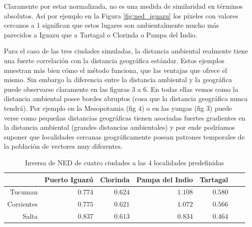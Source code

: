   \par Claramente por estar normalizada, no es una medida de similaridad en
    términos absolutos. Así por ejemplo en la Figura \ref{fig:ned_iguazu} los
    píxeles con valores
    cercanos a 1 significan que estos lugares son ambientalmente mucho más
    parecidos a Iguazu que a Tartagal o Clorinda o Pampa del Indio.





    \par Para el caso de las tres ciudades simuladas, la distancia ambiental
    realmente tiene una fuerte correlación con la distancia geográfica estándar.
    Estos ejemplos muestran más bien cómo el método funciona, que las ventajas
    que ofrece el mismo. Sin embargo la diferencia entre la distancia ambiental
    y la geográfica puede observarse claramente en las figuras 3 a 6.
    En todas ellas vemos como la distancia ambiental posee bordes abruptos
    (cosa que la distancia geográfica nunca tendrá).
    Por ejemplo en la Mesopotamia (fig 4) o en las yungas (fig 3) puede verse
    como pequeñas distancias geográficas tienen asociadas fuertes gradientes en
    la distancia ambiental (grandes distancias ambientales) y por ende
    podríamos suponer que localidades cercanas geográficamente posean patrones
    temporales de la población de vectores muy diferentes.

    \begin{table}[hbt]
    \centering
    \caption{Inversa de NED de cuatro ciudades a las 4 localidades predefinidas}\label{Tab:comparacion_ned}
    \begin{tabular}{*7{r}}
    \toprule
    & Puerto Iguazú
    & Clorinda
    & Pampa del Indio
    & Tartagal \\ \midrule
    Tucuman
    &$0.774$
    &$0.624$
    &$1.108$%
    &$0.580$\\
    Corrientes
    &$0.775$
    &$0.621$
    &$1.072$
    &$0.566$ \\
    Salta
    &$0.837$
    &$0.613$
    &$0.834$   %
    &$0.464$ \\
    \bottomrule
    \end{tabular}
    \end{table}
